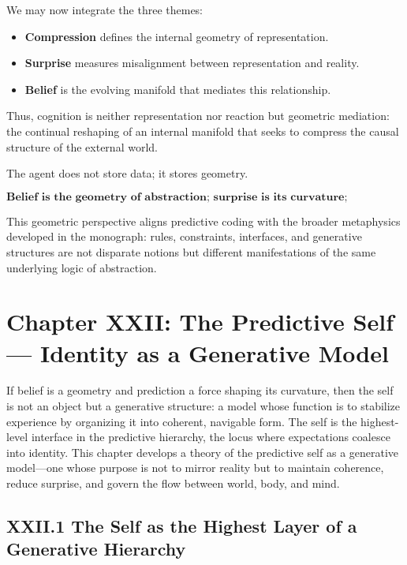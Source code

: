 \documentclass[11pt,letterpaper]{article}
\begin{document}
We may now integrate the three themes:

\begin{itemize}
    \item \textbf{Compression} defines the internal geometry of representation.
    \item \textbf{Surprise} measures misalignment between representation and reality.
    \item \textbf{Belief} is the evolving manifold that mediates this relationship.
\end{itemize}

Thus, cognition is neither representation nor reaction but geometric mediation: the continual reshaping of an internal manifold that seeks to compress the causal structure of the external world.

The agent does not store data; it stores geometry.

\[
\textbf{Belief is the geometry of abstraction; surprise is its curvature;  
compression is its governing principle.}
\]

This geometric perspective aligns predictive coding with the broader metaphysics developed in the monograph: rules, constraints, interfaces, and generative structures are not disparate notions but different manifestations of the same underlying logic of abstraction.

\newpage
\section{Chapter XXII: The Predictive Self — Identity as a Generative Model}

If belief is a geometry and prediction a force shaping its curvature, then the self is not an object but a generative structure: a model whose function is to stabilize experience by organizing it into coherent, navigable form. The self is the highest-level interface in the predictive hierarchy, the locus where expectations coalesce into identity. This chapter develops a theory of the predictive self as a generative model—one whose purpose is not to mirror reality but to maintain coherence, reduce surprise, and govern the flow between world, body, and mind.

\subsection{XXII.1 The Self as the Highest Layer of a Generative Hierarchy}
\end{document}
